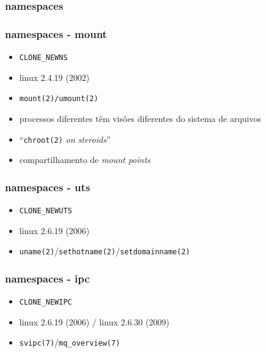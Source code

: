 \documentclass{beamer}
\begin{document}
\begin{frame}
    \frametitle{namespaces}
    \begin{itemize}
    \end{itemize}
\end{frame}

\begin{frame}
    \frametitle{namespaces - mount}
    \begin{itemize}
        \item \texttt{CLONE\_NEWNS}
        \item linux 2.4.19 (2002)
        \item \texttt{mount(2)/umount(2)}
        \item processos diferentes têm visões diferentes do sistema de arquivos
        \item ``\texttt{chroot(2)} \textit{on steroids}''
        \item compartilhamento de \textit{mount points}
    \end{itemize}
\end{frame}

\begin{frame}
    \frametitle{namespaces - uts}
    \begin{itemize}
        \item \texttt{CLONE\_NEWUTS}
        \item linux 2.6.19 (2006)
        \item \texttt{uname(2)}/\texttt{sethotname(2)}/\texttt{setdomainname(2)}
    \end{itemize}
\end{frame}

\begin{frame}
    \frametitle{namespaces - ipc}
    \begin{itemize}
        \item \texttt{CLONE\_NEWIPC}
        \item linux 2.6.19 (2006) / linux 2.6.30 (2009)
        \item \texttt{svipc(7)}/\texttt{mq\_overview(7)}
    \end{itemize}
\end{frame}
\end{document}
